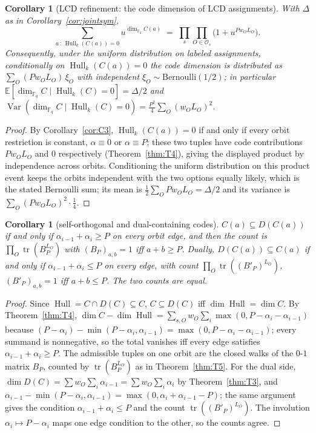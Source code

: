 \documentclass[11pt]{article}
\newtheorem{corollary}[theorem]{Corollary}
\theoremstyle{definition}
\theoremstyle{remark}
\newcommand{\Fq}{\mathbb{F}_q}
\newcommand{\Hull}{\operatorname{Hull}}
\newcommand{\tr}{\operatorname{tr}}
\newcommand{\E}{\mathbb{E}}
\begin{document}
\begin{corollary}[LCD refinement: the code dimension of LCD assignments]
\label{cor:LCDref}
With \(\Delta\) as in Corollary~\ref{cor:jointsym},
\[
\sum_{a \,:\, \Hull_k(C(a)) = 0} u^{\dim_{\Fq} C(a)}
\;=\; \prod_{s} \prod_{O \in \mathcal{O}_s} \big(1 + u^{P w_O L_O}\big).
\]
Consequently, under the uniform distribution on labeled assignments,
conditionally on \(\Hull_k(C(a)) = 0\) the code dimension is distributed
as \(\sum_O (P w_O L_O)\, \xi_O\) with independent
\(\xi_O \sim \mathrm{Bernoulli}(1/2)\); in particular
\(\E[\dim_{\Fq} C \mid \Hull_k(C) = 0] = \Delta/2\) and
\(\operatorname{Var}(\dim_{\Fq} C \mid \Hull_k(C) = 0)
= \frac{P^2}{4} \sum_O (w_O L_O)^2\).
\end{corollary}

\begin{proof}
By Corollary~\ref{cor:C3}, \(\Hull_k(C(a)) = 0\) if and only if every
orbit restriction is constant, \(\alpha \equiv 0\) or \(\alpha \equiv
P\); these two tuples have code contributions \(Pw_OL_O\) and \(0\)
respectively (Theorem~\ref{thm:T4}), giving the displayed product by
independence across orbits. Conditioning the uniform distribution on
this product event keeps the orbits independent with the two options
equally likely, which is the stated Bernoulli sum; its mean is
\(\tfrac12 \sum_O Pw_OL_O = \Delta/2\) and its variance is
\(\sum_O (Pw_OL_O)^2 \cdot \tfrac14\).
\end{proof}

\begin{corollary}[self-orthogonal and dual-containing codes]
\label{cor:C4}
\(C(a) \subseteq D(C(a))\) if and only if
\(\alpha_{i-1} + \alpha_i \ge P\) on every orbit edge, and then the count
is \(\prod_O \tr(B_P^{L_O})\) with \((B_P)_{a,b} = 1\) iff \(a+b \ge P\).
Dually, \(D(C(a)) \subseteq C(a)\) if and only if
\(\alpha_{i-1} + \alpha_i \le P\) on every edge, with count
\(\prod_O \tr((B'_P)^{L_O})\), \((B'_P)_{a,b} = 1\) iff \(a+b \le P\).
The two counts are equal.
\end{corollary}

\begin{proof}
Since \(\Hull = C \cap D(C) \subseteq C\), \(C \subseteq D(C)\) iff
\(\dim \Hull = \dim C\). By Theorem~\ref{thm:T4},
\(\dim C - \dim \Hull = \sum_{s,O} w_O \sum_i \max(0, P-\alpha_i-\alpha_{i-1})\)
because \((P-\alpha_i) - \min(P-\alpha_i,\alpha_{i-1}) =
\max(0, P-\alpha_i-\alpha_{i-1})\); every summand is nonnegative, so the
total vanishes iff every edge satisfies \(\alpha_{i-1}+\alpha_i \ge P\).
The admissible tuples on one orbit are the closed walks of the \(0\)-\(1\)
matrix \(B_P\), counted by \(\tr(B_P^{L_O})\) as in
Theorem~\ref{thm:T5}. For the dual side, \(\dim D(C) =
\sum w_O \sum_i \alpha_{i-1} = \sum w_O \sum_i \alpha_i\) by
Theorem~\ref{thm:T3}, and \(\alpha_{i-1} - \min(P-\alpha_i,\alpha_{i-1})
= \max(0, \alpha_i+\alpha_{i-1}-P)\); the same argument gives the
condition \(\alpha_{i-1}+\alpha_i \le P\) and the count
\(\tr((B'_P)^{L_O})\). The involution \(\alpha_i \mapsto P-\alpha_i\)
maps one edge condition to the other, so the counts agree.
\end{proof}
\end{document}

